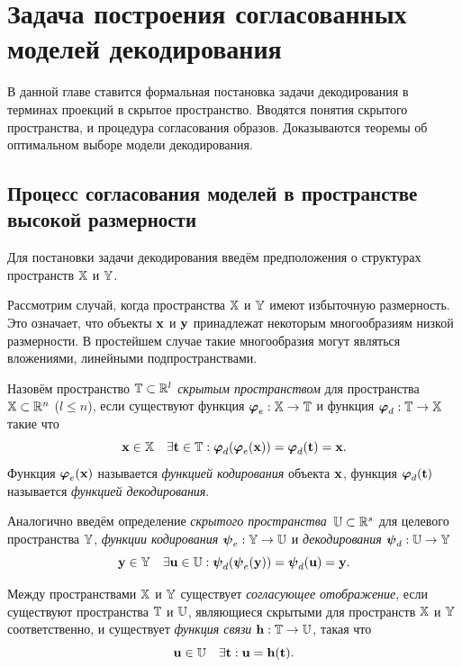 \chapter{Задача построения согласованных моделей декодирования}
\label{ch:pls}

В данной главе ставится формальная постановка задачи декодирования в терминах проекций в скрытое пространство. 
Вводятся понятия скрытого пространства, и процедура согласования образов.
Доказываются теоремы об оптимальном выборе модели декодирования.

\section{Процесс согласования моделей в пространстве высокой размерности}

\hrulefill

Для постановки задачи декодирования введём предположения о структурах пространств $\mathbb{X}$ и $\mathbb{Y}$.
\begin{assumption}
	Рассмотрим случай, когда пространства $\mathbb{X}$ и $\mathbb{Y}$ имеют избыточную размерность. 
	Это означает, что объекты $\mathbf{x}$ и $\mathbf{y}$ принадлежат некоторым многообразиям низкой размерности. В простейшем случае такие многообразия могут являться вложениями, линейными подпространствами.
\end{assumption}

\begin{definition}
	Назовём пространство $\mathbb{T} \subset \mathbb{R}^l$ \textit{скрытым пространством} для пространства $\mathbb{X} \subset \mathbb{R}^n$ ($l \leq n$), если существуют функция $\boldsymbol{\varphi}_e: \mathbb{X} \to \mathbb{T}$ и функция $\boldsymbol{\varphi}_d: \mathbb{T}  \to \mathbb{X}$ такие что
	\[
	\mathbf{x} \in \mathbb{X} \quad \exists \mathbf{t} \in \mathbb{T}: \boldsymbol{\varphi}_d (\boldsymbol{\varphi}_e(\mathbf{x})) = \boldsymbol{\varphi}_d(\mathbf{t}) = \mathbf{x}.
	\]
	Функция $\boldsymbol{\varphi}_e(\mathbf{x})$ называется \textit{функцией кодирования} объекта $\mathbf{x}$, функция $\boldsymbol{\varphi}_d(\mathbf{t})$  называется \textit{функцией декодирования}. 
	
	Аналогично введём определение \textit{скрытого пространства}~$\mathbb{U} \subset \mathbb{R}^s$ для целевого пространства $\mathbb{Y}$, \textit{функции кодирования} $\boldsymbol{\psi}_e: \mathbb{Y} \to \mathbb{U}$ и \textit{декодирования} $\boldsymbol{\psi}_d: \mathbb{U}  \to \mathbb{Y}$
	\[
	 \mathbf{y} \in \mathbb{Y} \quad  \exists \mathbf{u} \in \mathbb{U}: \boldsymbol{\psi}_d (\boldsymbol{\psi}_e(\mathbf{y})) = \boldsymbol{\psi}_d(\mathbf{u}) = \mathbf{y}.
	\]
\end{definition}

\begin{definition}
	Между пространствами $\mathbb{X}$ и $\mathbb{Y}$ существует \textit{согласующее отображение}, если существуют пространства $\mathbb{T}$ и $\mathbb{U}$, являющиеся скрытыми для пространств $\mathbb{X}$ и $\mathbb{Y}$ соответственно, и существует \textit{функция связи} $\mathbf{h}: \mathbb{T} \rightarrow \mathbb{U}$, такая что
	\[
	\mathbf{u} \in \mathbb{U} \quad \exists \mathbf{t}:  \mathbf{u} = \mathbf{h}(\mathbf{t}).
	\]
\end{definition}

